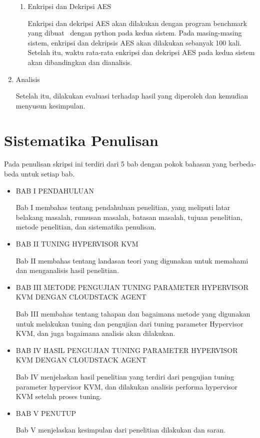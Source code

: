 \begin{enumerate}
\begin{enumerate}
                  \item Enkripsi dan Dekripsi AES

                        Enkripsi dan dekripsi AES akan dilakukan dengan program benchmark yang dibuat \saya\ dengan python pada kedua sistem. Pada masing-masing sistem, enkripsi dan dekripsis AES akan dilakukan sebanyak 100 kali. Setelah itu, waktu rata-rata enkripsi dan dekripsi AES pada kedua sistem akan dibandingkan dan dianalisis.
            \end{enumerate}

      \item Analisis

            Setelah itu, dilakukan evaluasi terhadap hasil yang diperoleh dan kemudian menyusun kesimpulan.
\end{enumerate}


\section{Sistematika Penulisan}
Pada penulisan skripsi ini terdiri dari 5 bab dengan pokok bahasan yang berbeda-beda untuk setiap bab.
\begin{itemize}
      \item BAB I PENDAHULUAN

            Bab I membahas tentang pendahuluan penelitian, yang meliputi latar belakang masalah, rumusan masalah, batasan masalah, tujuan penelitian, metode penelitian, dan sistematika penulisan.

      \item BAB II TUNING HYPERVISOR KVM

            Bab II membahas tentang landasan teori yang digunakan untuk memahami dan menganalisis hasil penelitian.

      \item BAB III METODE PENGUJIAN TUNING PARAMETER HYPERVISOR KVM DENGAN CLOUDSTACK AGENT

            Bab III membahas tentang tahapan dan bagaimana metode yang digunakan untuk melakukan tuning dan pengujian dari tuning parameter Hypervisor KVM, dan juga bagaimana analisis akan dilakukan.

      \item BAB IV HASIL PENGUJIAN TUNING PARAMETER HYPERVISOR KVM DENGAN CLOUDSTACK AGENT

            Bab IV menjelaskan hasil penelitian yang terdiri dari pengujian tuning parameter hypervisor KVM, dan dilakukan analisis performa hypervisor KVM setelah proses tuning.

      \item BAB V PENUTUP

            Bab V menjelaskan kesimpulan dari penelitian dilakukan dan saran.
\end{itemize}